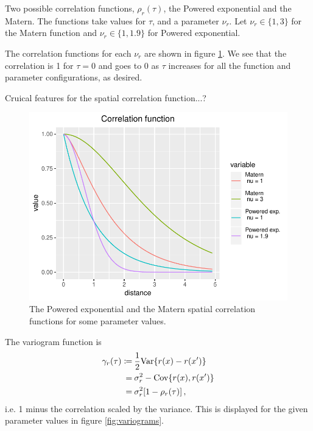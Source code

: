 Two possible correlation functions, $\rho_r(\tau)$, the Powered exponential and the Matern. The functions take values for $\tau$, and a parameter $\nu_r$. Let $\nu_r \in \{1,3\}$ for the Matern function and $\nu_r \in \{1,1.9\}$ for Powered exponential. 

The correlation functions for each $\nu_r$ are shown in figure \ref{fig:corrfunc}. We see that the correlation is 1 for $\tau = 0$ and goes to 0 as $\tau$ increases for all the function and parameter configurations, as desired.

Cruical features for the spatial correlation function...?

\begin{figure}
    \centering
    \includegraphics{figures/corrfunc.pdf}
    \caption{The Powered exponential and the Matern spatial correlation functions for some parameter values.}
    \label{fig:corrfunc}
\end{figure}

The variogram function is
%
\begin{align*}
\gamma_r(\tau)
\coloneqq&\: \frac{1}{2} \mathrm{Var} \{ r(x) - r(x') \} \\
=&\: \sigma_r^2 - \mathrm{Cov}\{r(x), r(x')\} \\
=&\: \sigma_r^2[1 - \rho_r(\tau)]\, ,
\end{align*}
%
i.e. 1 minus the correlation scaled by the variance.
This is displayed for the given parameter values in figure \ref{fig:variograms}.

